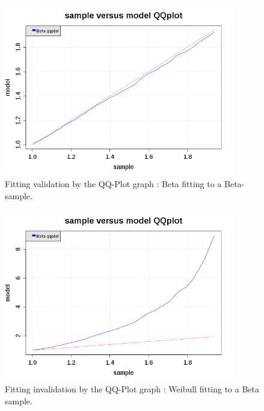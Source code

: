 \begin{figure}[H]
  \begin{center}
    \includegraphics[width=10cm]{beta_QQplot.png}
  \end{center}
  \caption{Fitting validation by the QQ-Plot graph : Beta fitting to a Beta-sample.}
  \label{qqplotExRight}
\end{figure}

\begin{figure}[H]
  \begin{center}
    \includegraphics[width=10cm]{weibull_QQplot.png}
  \end{center}
  \caption{Fitting invalidation by the QQ-Plot graph : Weibull fitting to a Beta sample.}
  \label{qqplotExFalse}
\end{figure}

